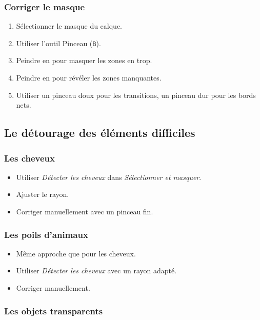 \subsubsection{Corriger le masque}

\begin{enumerate}
    \item Sélectionner le masque du calque.
    \item Utiliser l'outil Pinceau (\texttt{B}).
    \item Peindre en  pour masquer les zones en trop.
    \item Peindre en  pour révéler les zones manquantes.
    \item Utiliser un pinceau doux pour les transitions, un pinceau dur pour les bords nets.
\end{enumerate}

\subsection{Le détourage des éléments difficiles}

\subsubsection{Les cheveux}

\begin{itemize}
    \item Utiliser \emph{Détecter les cheveux} dans \emph{Sélectionner et masquer}.
    \item Ajuster le rayon.
    \item Corriger manuellement avec un pinceau fin.
\end{itemize}

\subsubsection{Les poils d'animaux}

\begin{itemize}
    \item Même approche que pour les cheveux.
    \item Utiliser \emph{Détecter les cheveux} avec un rayon adapté.
    \item Corriger manuellement.
\end{itemize}

\subsubsection{Les objets transparents}

